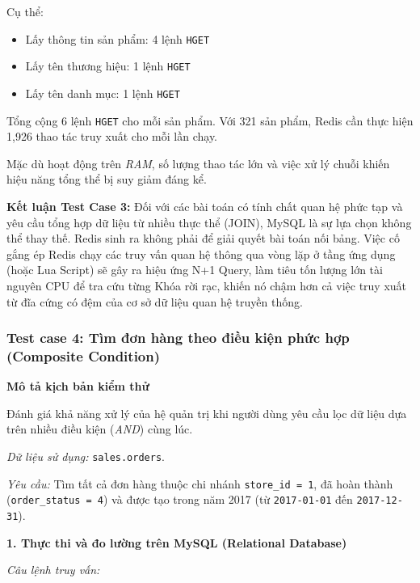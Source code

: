 Cụ thể:
\begin{itemize}
\item Lấy thông tin sản phẩm: 4 lệnh \texttt{HGET}
\item Lấy tên thương hiệu: 1 lệnh \texttt{HGET}
\item Lấy tên danh mục: 1 lệnh \texttt{HGET}
\end{itemize}

Tổng cộng 6 lệnh \texttt{HGET} cho mỗi sản phẩm. Với 321 sản phẩm,
Redis cần thực hiện 1{,}926 thao tác truy xuất cho mỗi lần chạy.

Mặc dù hoạt động trên \textit{RAM}, số lượng thao tác lớn và việc xử lý
chuỗi khiến hiệu năng tổng thể bị suy giảm đáng kể.


\noindent\textbf{Kết luận Test Case 3:} Đối với các bài toán có tính chất quan hệ phức tạp và yêu cầu tổng hợp dữ liệu từ nhiều thực thể (JOIN), MySQL là sự lựa chọn không thể thay thế. Redis sinh ra không phải để giải quyết bài toán nối bảng. Việc cố gắng ép Redis chạy các truy vấn quan hệ thông qua vòng lặp ở tầng ứng dụng (hoặc Lua Script) sẽ gây ra hiệu ứng N+1 Query, làm tiêu tốn lượng lớn tài nguyên CPU để tra cứu từng Khóa rời rạc, khiến nó chậm hơn cả việc truy xuất từ đĩa cứng có đệm của cơ sở dữ liệu quan hệ truyền thống.



\subsubsection{Test case 4: Tìm đơn hàng theo điều kiện phức hợp (Composite Condition)}

\vspace{0.5em}

\noindent\textbf{Mô tả kịch bản kiểm thử}

Đánh giá khả năng xử lý của hệ quản trị khi người dùng yêu cầu lọc dữ liệu dựa trên nhiều điều kiện (\textit{AND}) cùng lúc.

\textit{Dữ liệu sử dụng:} \texttt{sales.orders}.

\textit{Yêu cầu:} Tìm tất cả đơn hàng thuộc chi nhánh \texttt{store\_id = 1}, 
đã hoàn thành (\texttt{order\_status = 4}) và được tạo trong năm 2017 
(từ \texttt{2017-01-01} đến \texttt{2017-12-31}).

\vspace{1em}

\noindent\textbf{1. Thực thi và đo lường trên MySQL (Relational Database)}

\textit{Câu lệnh truy vấn:}

